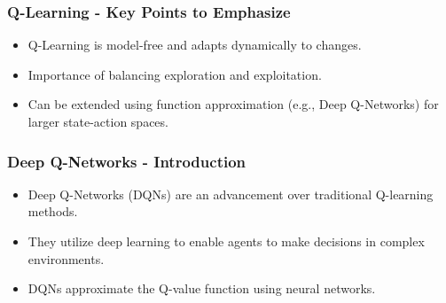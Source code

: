 \documentclass[aspectratio=169]{beamer}
\begin{document}
\begin{frame}[fragile]
    \frametitle{Q-Learning - Key Points to Emphasize}
    \begin{itemize}
        \item Q-Learning is model-free and adapts dynamically to changes.
        \item Importance of balancing exploration and exploitation.
        \item Can be extended using function approximation (e.g., Deep Q-Networks) for larger state-action spaces.
    \end{itemize}
\end{frame}

\begin{frame}[fragile]
    \frametitle{Deep Q-Networks - Introduction}
    \begin{itemize}
        \item Deep Q-Networks (DQNs) are an advancement over traditional Q-learning methods.
        \item They utilize deep learning to enable agents to make decisions in complex environments.
        \item DQNs approximate the Q-value function using neural networks.
    \end{itemize}
\end{frame}
\end{document}

